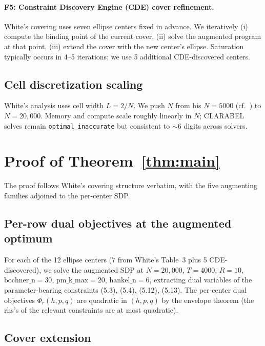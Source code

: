 \documentclass[11pt]{article}
\theoremstyle{plain}
\theoremstyle{definition}
\begin{document}
\paragraph{F5: Constraint Discovery Engine (CDE) cover refinement.}
White's covering uses seven ellipse centers fixed in advance. We
iteratively (i) compute the binding point of the current cover,
(ii) solve the augmented program at that point, (iii) extend the cover
with the new center's ellipse. Saturation typically occurs in 4--5
iterations; we use 5 additional CDE-discovered centers.

\subsection{Cell discretization scaling}\label{sec:scaling}

White's analysis uses cell width $L = 2/N$. We push $N$ from his
$N = 5000$ (cf.\ \cite[\S5]{White2023}) to $N = 20{,}000$. Memory and
compute scale roughly linearly in $N$; CLARABEL solves remain
\texttt{optimal\_inaccurate} but consistent to $\sim 6$ digits across
solvers.

\section{Proof of Theorem~\ref{thm:main}}\label{sec:proof}

The proof follows White's covering structure verbatim, with the five
augmenting families adjoined to the per-center SDP.

\subsection{Per-row dual objectives at the augmented optimum}

For each of the 12 ellipse centers (7 from White's Table~3 plus 5
CDE-discovered), we solve the augmented SDP at $N = 20{,}000$,
$T = 4000$, $R = 10$, $\text{bochner\_n} = 30$, $\text{pm\_k\_max} = 20$,
$\text{hankel\_n} = 6$, extracting dual variables of the
parameter-bearing constraints (5.3), (5.4), (5.12), (5.13). The
per-center dual objectives $\Phi_r(h, p, q)$ are quadratic in
$(h, p, q)$ by the envelope theorem (the rhs's of the relevant
constraints are at most quadratic).

\subsection{Cover extension}
\end{document}

